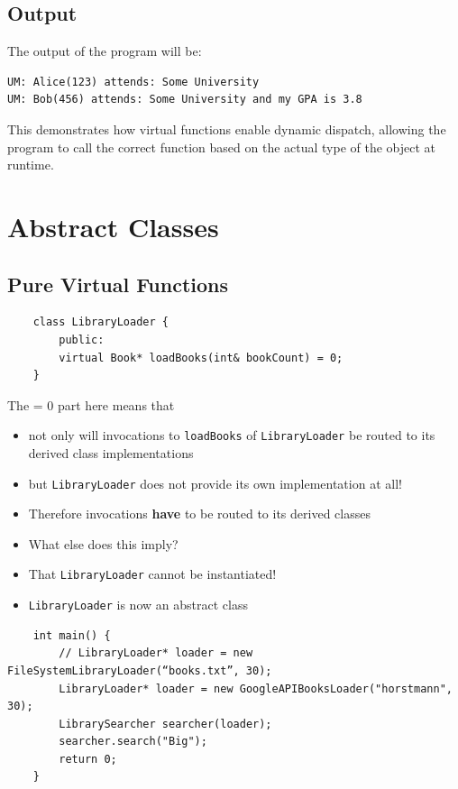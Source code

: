 \documentclass{report}
\begin{document}
\subsection{Output}

The output of the program will be:

\begin{verbatim}
UM: Alice(123) attends: Some University
UM: Bob(456) attends: Some University and my GPA is 3.8
\end{verbatim}

This demonstrates how virtual functions enable dynamic dispatch, allowing the program to call the correct function based on the actual type of the object at runtime.

\section{Abstract Classes}

\subsection{Pure Virtual Functions}

\begin{verbatim}
	class LibraryLoader {
		public:
		virtual Book* loadBooks(int& bookCount) = 0;
	}
\end{verbatim}

The = 0 part here means that
\begin{itemize}
	\item not only will invocations to \texttt{loadBooks} of \texttt{LibraryLoader} be routed to its derived class implementations
	\item but \texttt{LibraryLoader} does not provide its own implementation at all!
	\item Therefore invocations \textbf{have} to be routed to its derived classes
	\item What else does this imply?
	\item That \texttt{LibraryLoader} cannot be instantiated!
	\item \texttt{LibraryLoader} is now an abstract class
\end{itemize}

\begin{verbatim}
	int main() {
		// LibraryLoader* loader = new FileSystemLibraryLoader(“books.txt”, 30);
		LibraryLoader* loader = new GoogleAPIBooksLoader("horstmann", 30);
		LibrarySearcher searcher(loader);
		searcher.search("Big");
		return 0;
	}
\end{verbatim}
\end{document}
